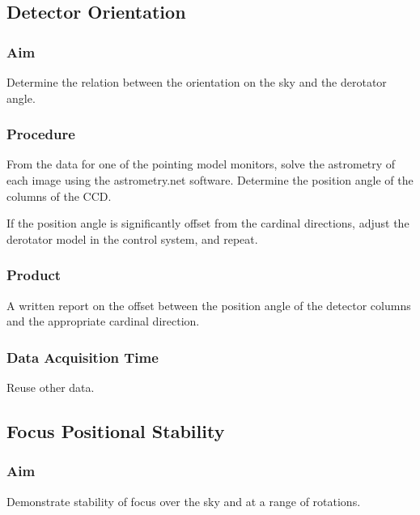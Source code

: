 \documentclass{article}
\begin{document}

\subsection{Detector Orientation}

\subsubsection{Aim}

Determine the relation between the orientation on the sky and the derotator angle.

\subsubsection{Procedure}

From the data for one of the pointing model monitors, solve the astrometry of each image using the astrometry.net software. Determine the position angle of the columns of the CCD.

If the position angle is significantly offset from the cardinal directions, adjust the derotator model in the control system, and repeat.

\subsubsection{Product}

A written report on the offset between the position angle of the detector columns and the appropriate cardinal direction.

\subsubsection{Data Acquisition Time}

Reuse other data.


\subsection{Focus Positional Stability}

\subsubsection{Aim}

Demonstrate stability of focus over the sky and at a range of rotations.
\end{document}
